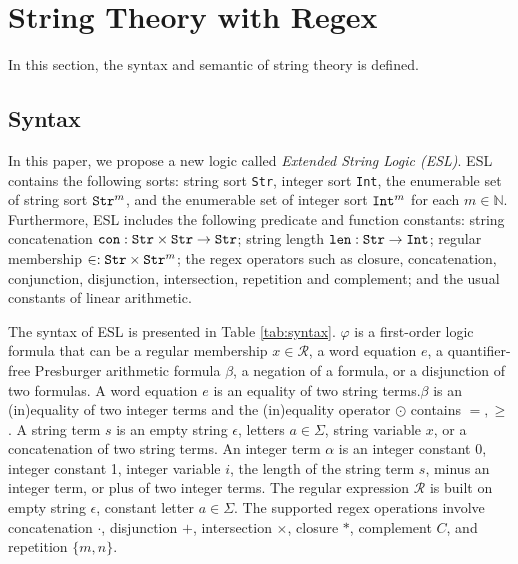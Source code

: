 \documentclass[runningheads]{llncs}
\newcommand*{\regex}{\mathcal{R}}
\begin{document}
\section{String Theory with Regex} \label{sec:str_t}
In this section, the syntax and semantic of string theory is defined.
\subsection{Syntax}
In this paper, we propose a new logic called \textit{Extended String Logic (ESL)}. ESL contains the following
sorts: string sort \verb|Str|, integer sort \verb|Int|, the enumerable set of string
sort $\verb|Str|^m$, and the enumerable set of integer sort $\verb|Int|^m$ for each $m\in
  \mathbb{N}$. Furthermore, ESL includes the following predicate and function constants:
string concatenation $\verb|con|:\verb|Str|\times\verb|Str|\rightarrow \verb|Str|$;
string length $\verb|len|: \verb|Str|\rightarrow \verb|Int|$; regular membership $\in:
\verb|Str|\times \verb|Str|^m$; the regex operators such as closure, concatenation,  conjunction, disjunction, intersection, repetition and complement; and the usual constants of linear arithmetic. 

The syntax of ESL is presented in Table \ref{tab:syntax}. $\varphi$ is a first-order logic formula that can be a regular membership $x\in\regex$,
a word equation $e$, a quantifier-free Presburger arithmetic formula $\beta$, a negation of a formula, or a
disjunction of two formulas. A word equation $e$ is an equality of two string terms.$\beta$ is an (in)equality of two integer terms and the (in)equality operator $\odot$ contains $=, \geq$. A string term $s$ is an empty string $\epsilon$, letters
$a\in\Sigma$, string variable $x$, or a concatenation of two string terms. An integer
term $\alpha$ is an integer constant 0, integer constant 1, integer variable $i$, the
length of the string term $s$, minus an integer term, or plus of two integer terms. The
regular expression $\regex$ is built on empty string $\epsilon$, constant letter $a\in \Sigma$. The supported regex operations involve concatenation $\cdot$, disjunction $+$,
intersection $\times$, closure $*$, complement $C$, and repetition $\{m, n\}$.
\end{document}
